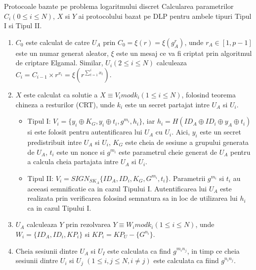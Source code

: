 \documentclass[11pt]{beamer}
\begin{document}
\begin{frame}[t,allowframebreaks]{Protocoale bazate pe problema logaritmului discret}
Calcularea parametrilor $C_i (0 \leq i \leq N)$, $X$ si $Y$ ai protocolului bazat pe DLP pentru ambele tipuri Tipul I si Tipul II.

\begin{enumerate}

\item $C_0$ este calculat de catre $U_A$ prin $C_0 = \xi(r) = \xi(g^r_A)$, unde $r_A \in [1, p-1]$ este un numar generat aleator, $\xi$ este un mesaj ce va fi criptat prin algoritmul de criptare Elgamal. Similar, $U_i (2 \leq i \leq N)$ calculeaza $C_i = C_{i-1} \times r^{x_i} = \xi(r^{\sum^i_{t=1}x_t})$.

\item $X$ este calculat ca solutie a $X \equiv V_i mod k_i (1 \leq  i \leq N)$, folosind teorema chineza a resturilor (CRT), unde $k_i$ este un secret partajat intre $U_A$ si $U_i$.

\begin{itemize}

\item Tipul I: $V_i = \{y_i \oplus K_G, y_i \oplus t_i, g^{m_i}, h_i\}$, iar $h_i = H(ID_A \oplus ID_i \oplus y_A \oplus t_i)$ si este folosit pentru autentificarea lui $U_A$ cu $U_i$. Aici, $y_i$ este un secret predistribuit intre $U_A$ si $U_i$, $K_G$ este cheia de sesiune a grupului generata de $U_A$, $t_i$ este un nonce si $g^{m_i}$ este parametrul cheie generat de $U_A$ pentru a calcula cheia partajata intre $U_A$ si $U_i$.
\item Tipul II: $V_i = SIGN_{SK_A}\{ID_A, ID_i, K_G, G^{m_i}, t_i\}$. Parametrii $g^{m_i}$ si $t_i$ au aceeasi semnificatie ca in cazul Tipului I. Autentificarea lui $U_A$ este realizata prin verificarea folosind semnatura sa in loc de utilizarea lui $h_i$ ca in cazul Tipului I.

\end{itemize}

\item $U_A$ calculeaza $Y$ prin rezolvarea $Y \equiv W_i mod k_i (1 \leq i \leq N)$, unde $W_i = \{ID_A, ID_i, KP_i\}$ si $KP_i = KP_U - \{G^{n_i}\}$.

\item Cheia sesiunii dintre $U_A$ si $U_I$ este calculata ca find  $g^{m_in_j}$, in timp ce cheia sesiunii dintre $U_i$ si $U_j$ $(1 \leq i, j \leq N, i \neq j)$ este calculata ca fiind $g^{n_in_j}$.

\end{enumerate}

\end{frame}
\end{document}
